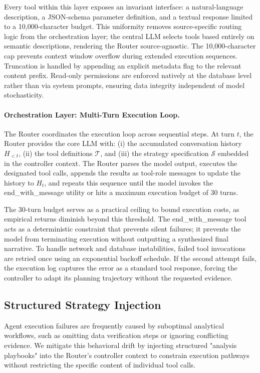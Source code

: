 Every tool within this layer exposes an invariant interface: a natural-language description, a JSON-schema parameter definition, and a textual response limited to a 10,000-character budget. This uniformity removes source-specific routing logic from the orchestration layer; the central LLM selects tools based entirely on semantic descriptions, rendering the Router source-agnostic. The 10,000-character cap prevents context window overflow during extended execution sequences. Truncation is handled by appending an explicit metadata flag to the relevant content prefix. Read-only permissions are enforced natively at the database level rather than via system prompts, ensuring data integrity independent of model stochasticity.

\paragraph{Orchestration Layer: Multi-Turn Execution Loop.}
The Router coordinates the execution loop across sequential steps. At turn $t$, the Router provides the core LLM with: (i) the accumulated conversation history $H_{<t}$, (ii) the tool definitions $\mathcal{T}$, and (iii) the strategy specification $\mathcal{S}$ embedded in the controller context. The Router parses the model output, executes the designated tool calls, appends the results as tool-role messages to update the history to $H_t$, and repeats this sequence until the model invokes the end\_with\_message utility or hits a maximum execution budget of 30 turns.

The 30-turn budget serves as a practical ceiling to bound execution costs, as empirical returns diminish beyond this threshold. The end\_with\_message tool acts as a deterministic constraint that prevents silent failures; it prevents the model from terminating execution without outputting a synthesized final narrative. To handle network and database instabilities, failed tool invocations are retried once using an exponential backoff schedule. If the second attempt fails, the execution log captures the error as a standard tool response, forcing the controller to adapt its planning trajectory without the requested evidence.

\subsection{Structured Strategy Injection}

Agent execution failures are frequently caused by suboptimal analytical workflows, such as omitting data verification steps or ignoring conflicting evidence. We mitigate this behavioral drift by injecting structured "analysis playbooks" into the Router's controller context to constrain execution pathways without restricting the specific content of individual tool calls.

